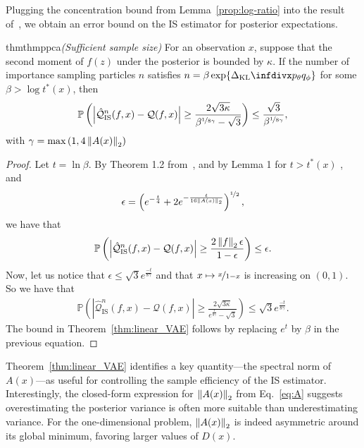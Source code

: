 Plugging the concentration bound from Lemma~\ref{prop:log-ratio} into the result of~\cite{Chatterjee2018}, we obtain an error bound on the IS estimator for posterior expectations.
\begin{restatable}{thm}{thmppca}\emph{(Sufficient sample size)}\label{thm:linear_VAE}
For an observation $x$, suppose that the second moment of $f(z)$ under the posterior is bounded by $\kappa$. If the number of importance sampling particles $n$ satisfies $n = \beta \exp\{\kl{p_\theta}{q_\phi}\}$ for some $\beta > \log t^*(x)$, then
\begin{align}
\label{eq:tail_sample}
    \mathbb{P}\left(\left|\hat{\mathcal{Q}}^n_{\textrm{IS}}(f, x) -  \mathcal{Q}(f, x) \right| \geq \frac{2\sqrt{3\kappa}}{\beta^{\nicefrac{1}{8\gamma}} - \sqrt{3}}\right) \leq \frac{\sqrt{3}}{\beta^{\nicefrac{1}{8\gamma}}},
\end{align}
with $\gamma = \max\left(1, 4\left\lVert A(x)\right\rVert_2\right)$
\end{restatable}
\begin{proof}
    Let $t = \ln \beta$. By Theorem 1.2 from~\cite{Chatterjee2018}, and by Lemma 1 for $t > t^*(x)$
    , and 
    \begin{align}
    \epsilon = \left(e^{-\frac{t}{4}} + 2e^{-\frac{t}{16\left\lVert A(x)\right\rVert_2}}\right)^{\nicefrac{1}{2}},
    \end{align}
    we have that
    \begin{align}
        \mathbb{P}\left(\left|\hat{\mathcal{Q}}^n_{\textrm{IS}}(f, x) -  \mathcal{Q}(f, x) \right| \geq \frac{2 \left\lVert f\right\rVert_2\epsilon}{1 - \epsilon}\right) \leq \epsilon.
    \end{align}
    Now, let us notice that
    \(
        \epsilon \leq \sqrt{3}e^{\frac{-t}{8\gamma}}
    \)
    and that $x \mapsto \nicefrac{x}{1-x}$ is increasing on $(0, 1)$. So we have that 
    \begin{align}
        \mathbb{P}\left(\left|\hat{\mathcal{Q}}^n_{\textrm{IS}}(f, x) -  \mathcal{Q}(f, x) \right| \geq \frac{2\sqrt{3\kappa}}{e^{\frac{t}{8\gamma}} - \sqrt{3}}\right) \leq \sqrt{3}e^{\frac{-t}{8\gamma}}.
    \end{align}
    The bound in Theorem~\ref{thm:linear_VAE} follows by replacing $e^t$ by $\beta$ in the previous equation.
    \end{proof}
Theorem~\ref{thm:linear_VAE} identifies a key quantity---the spectral norm of $A(x)$---as useful for controlling the sample efficiency of the IS estimator. Interestingly, the closed-form expression for $\left\lVert A(x)\right\rVert_2$ from Eq.~\eqref{eq:A} suggests overestimating the posterior variance is often more suitable than underestimating variance. For the one-dimensional problem,  $\left\lVert A(x)\right\rVert_2$ is indeed asymmetric around its global minimum, favoring larger values of $D(x)$.


